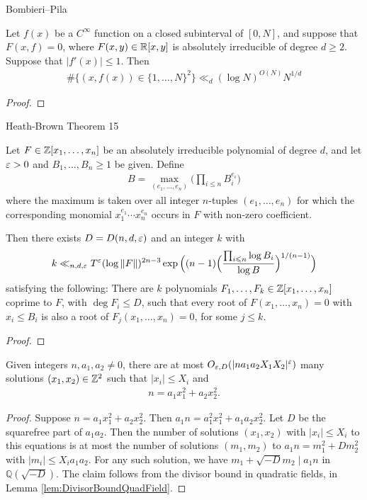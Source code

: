 Bombieri--Pila \cite[Theorem 4]{bp}
\begin{theorem}\label{thm:BombieriPilaforDet}
  Let $f(x)$ be a $C^\infty$ function on a closed subinterval of $[0,N]$,
  and suppose that$F (x, f ) = 0$, where $F(x, y) \in \mathbb{R}[x, y]$ is absolutely irreducible of degree $d \ge 2$.
  Suppose that $|f'(x)| \le 1$. Then
  \begin{align*}
    \#\{(x,f(x))\in \{1,\ldots,N\}^2 \}
    \ll_d (\log N)^{O(N)} N^{1/d}
  \end{align*}
\end{theorem}
\begin{proof}
\end{proof}

Heath-Brown Theorem 15

\begin{theorem} \label{thm:HeathBrownpadicDet}
  Let $F\in \mathbb{Z}[x_1 ,\ldots, x_n]$ be an absolutely irreducible polynomial of degree $d$,
  and let $\varepsilon > 0$ and $B_1,\ldots,B_n \ge 1$ be given. Define
  \begin{align*}
    B = \max_{(e_1,\ldots,e_n)}\Big( \prod_{i\le n} B_i^{e_i} \Big)
  \end{align*}
  where the maximum is taken over all integer $n$-tuples $(e_1,\ldots,e_n)$ for which the
  corresponding monomial $x_1^{e_1}\cdots x_n^{e_n}$ occurs in $F$ with non-zero coefficient.

  Then there exists $D = D(n,d,\varepsilon)$ and an integer $k$ with
  \begin{align*}
    k \ll_{n,d,\varepsilon}  T^\varepsilon (\log \|F\|)^{2n-3}
    \exp\Big((n-1)\Big(\frac{\prod_{i\leqslant n}\log B_i}{\log B}\Big)^{1/(n-1)}\Big)
  \end{align*}
  satisfying the following:
  There are $k$ polynomials $F_1,\ldots,F_k\in \mathbb{Z}[x_1 ,\ldots, x_n]$ coprime to $F$,
  with $\deg F_i \le D$, such that every root of $F(x_1 ,\ldots, x_n)=0$ with $x_i \le B_i$
  is also a root of $F_j(x_1 ,\ldots, x_n)=0$, for some $j\le k$.
\end{theorem}
\begin{proof}
\end{proof}

\begin{theorem} \label{thm:QuadraticFormsEstimate}
  Given integers $n,a_1,a_2\neq0$, there are
  at most $O_{\varepsilon,D}(|na_1a_2 X_1 X_2|^{\varepsilon})$ many solutions
  $(x_1,x_2)\in\mathbb{Z}^2$ such that $|x_i|\le X_i$ and
  \begin{align*}
    n = a_1 x_1^2 + a_2 x_2^2.
  \end{align*}
\end{theorem}
\begin{proof}
  Suppose $n=a_1x_1^2+a_2x_2^2$. Then $a_1n=a_1^2x_1^2+a_1a_2x_2^2$.
  Let $D$ be the squarefree part of $a_1a_2$. Then the number of solutions $(x_1,x_2)$
   with $|x_i|\leq X_i$ to this equations is at most the number of solutions $(m_1,m_2)$
    to $a_1n=m_1^2+Dm_2^2$ with $|m_i|\leq X_ia_1a_2$. For any such solution,
    we have $m_1+\sqrt{-D}m_2\mid a_1n$ in $\mathbb{Q}(\sqrt{-D})$.
    The claim follows from the divisor bound in quadratic fields, in Lemma \ref{lem:DivisorBoundQuadField}.
\end{proof}

